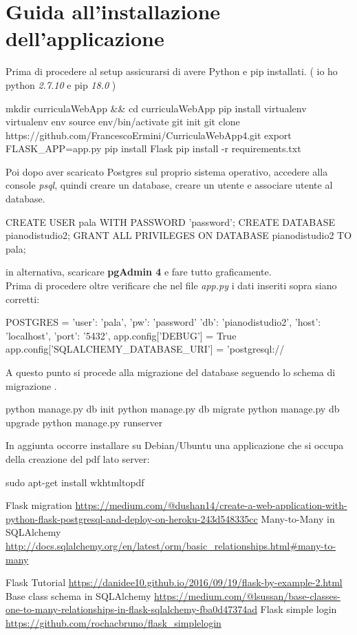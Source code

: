 \documentclass{article}
\begin{document}
\section{Guida all'installazione dell'applicazione}
Prima di procedere al setup assicurarsi di avere Python e pip installati. ( io ho python \textit{2.7.10} e pip \textit{18.0} ) 
\begin{shell}[caption=Setup Flask]
mkdir curriculaWebApp && cd curriculaWebApp
pip install virtualenv
virtualenv env
source env/bin/activate
git init
git clone https://github.com/FrancescoErmini/CurriculaWebApp4.git
export FLASK_APP=app.py
pip install Flask
pip install -r requirements.txt
\end{shell}
Poi dopo aver scaricato Postgres sul  proprio sistema operativo, accedere alla console \emph{psql}, quindi creare un database, creare un utente e associare utente al database.
\begin{shell}[caption=Create database]
CREATE USER pala WITH PASSWORD 'password';
CREATE DATABASE pianodistudio2;
GRANT ALL PRIVILEGES ON DATABASE pianodistudio2 TO pala;
\end{shell}
in alternativa, scaricare \textbf{pgAdmin 4} e fare tutto graficamente.\\
Prima di procedere oltre verificare che nel file \emph{app.py} i dati inseriti sopra siano corretti:
\begin{python}[firstnumber=16, caption=Flask db configuration]
POSTGRES = {
    'user': 'pala',
    'pw': 'password'
    'db': 'pianodistudio2',
    'host': 'localhost',
    'port': '5432',
}
app.config['DEBUG'] = True
app.config['SQLALCHEMY_DATABASE_URI'] = 'postgresql://%
\end{python}
A questo punto si procede alla migrazione del database seguendo lo schema di migrazione \cite{ref1}. 
\begin{shell}[caption=Initialize database]
python manage.py db init
python manage.py db migrate
python manage.py db upgrade
python manage.py runserver
\end{shell}
In aggiunta occorre installare su Debian/Ubuntu una applicazione che si occupa della creazione del pdf lato server:
\begin{shell}
sudo apt-get install wkhtmltopdf
\end{shell}
\newpage
\begin{thebibliography}{Bibliografia}
  Flask migration \url{https://medium.com/@dushan14/create-a-web-application-with-python-flask-postgresql-and-deploy-on-heroku-243d548335cc}
  Many-to-Many in SQLAlchemy  \url{http://docs.sqlalchemy.org/en/latest/orm/basic_relationships.html#many-to-many}

  Flask Tutorial \url{https://danidee10.github.io/2016/09/19/flask-by-example-2.html}
  Base class schema in SQLAlchemy \url{https://medium.com/@lsussan/base-classes-one-to-many-relationships-in-flask-sqlalchemy-fba0d47374ad}
 Flask simple login \url{https://github.com/rochacbruno/flask_simplelogin}
\end{thebibliography}
\end{document}

